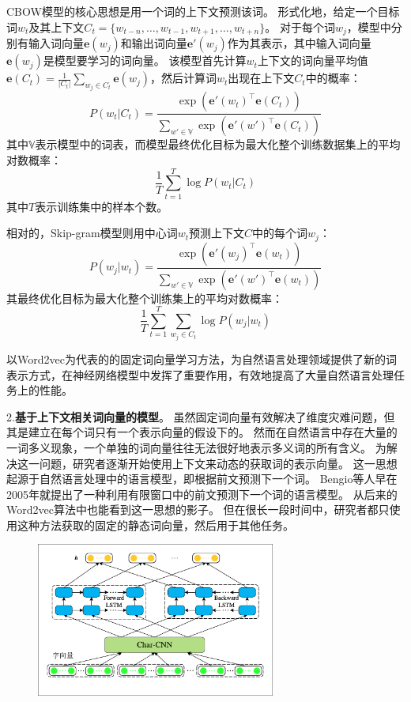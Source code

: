 CBOW模型的核心思想是用一个词的上下文预测该词。
形式化地，给定一个目标词$w_t$及其上下文$C_t=\{w_{t-n},\dots,w_{t-1},w_{t+1},\dots,w_{t+n}\}$。
对于每个词$w_j$，模型中分别有输入词向量$\bm{e}(w_j)$和输出词向量$\bm{e}'(w_j)$作为其表示，其中输入词向量$\bm{e}(w_j)$是模型要学习的词向量。
该模型首先计算$w_t$上下文的词向量平均值$\bm{e}(C_t)=\frac{1}{|C_t|}\sum_{w_j\in C_t}\bm{e}(w_j)$，然后计算词$w_t$出现在上下文$C_t$中的概率：
\begin{equation}
    P(w_t|C_t)=\frac{\exp(\bm{e'}(w_t)^{\top}\bm{e}(C_t))}{\sum_{w'\in \mathbb{V}}\exp(\bm{e'}(w')^{\top}\bm{e}(C_t))}
\end{equation}
其中$\mathbb{V}$表示模型中的词表，而模型最终优化目标为最大化整个训练数据集上的平均对数概率：
\begin{equation}
    \frac{1}{T}\sum_{t=1}^{T}\log P(w_t|C_t)
\end{equation}
其中$T$表示训练集中的样本个数。

相对的，Skip-gram模型则用中心词$w_t$预测上下文$C$中的每个词$w_j$：
\begin{equation}
    P(w_j|w_t)=\frac{\exp(\bm{e'}(w_j)^{\top}\bm{e}(w_t))}{\sum_{w'\in \mathbb{V}}\exp(\bm{e'}(w')^{\top}\bm{e}(w_t))}
\end{equation}
其最终优化目标为最大化整个训练集上的平均对数概率：
\begin{equation}
    \frac{1}{T}\sum_{t=1}^{T} \sum_{w_j\in C_t} \log P(w_j|w_t)
\end{equation}

以Word2vec为代表的的固定词向量学习方法，为自然语言处理领域提供了新的词表示方式，在神经网络模型中发挥了重要作用，有效地提高了大量自然语言处理任务上的性能。

2.\textbf{基于上下文相关词向量的模型}。
虽然固定词向量有效解决了维度灾难问题，但其是建立在每个词只有一个表示向量的假设下的。
然而在自然语言中存在大量的一词多义现象，一个单独的词向量往往无法很好地表示多义词的所有含义。
为解决这一问题，研究者逐渐开始使用上下文来动态的获取词的表示向量。
这一思想起源于自然语言处理中的语言模型，即根据前文预测下一个词。
Bengio等人早在2005年就提出了一种利用有限窗口中的\cite{bengio-etal-2003-neural}前文预测下一个词的语言模型。
从后来的Word2vec算法中也能看到这一思想的影子。
但在很长一段时间中，研究者都只使用这种方法获取的固定的静态词向量，然后用于其他任务。

\begin{figure}[htbp]
    \centering
    \includegraphics[width=0.7\textwidth]{figures/elmo.pdf}
\end{figure}

